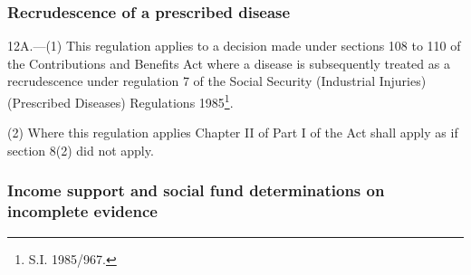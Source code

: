 \documentclass[12pt,a4paper]{article}
\begin{document}

\subsubsection[12A. Recrudescence of a prescribed disease]{Recrudescence of a prescribed disease}

12A.---(1)  This regulation applies to a decision made under sections 108 to 110 of the Contributions and Benefits Act where a disease is subsequently treated as a recrudescence under regulation 7 of the Social Security (Industrial Injuries) (Prescribed Diseases) Regulations 1985\footnote{\frenchspacing S.I. 1985/967.}.

(2) Where this regulation applies Chapter II of Part I of the Act shall apply as if section 8(2) did not apply.


\subsubsection[13. Income support and social fund determinations on incomplete evidence]{\sloppy Income support and social fund determinations on incomplete evidence}
\end{document}
